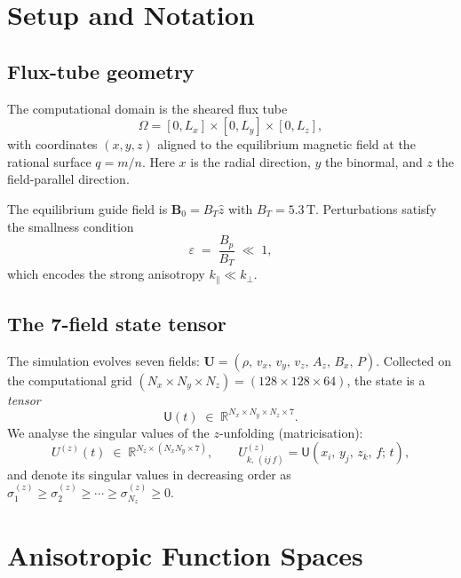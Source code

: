 \documentclass[12pt, a4paper]{article}
\newcommand{\R}{\mathbb{R}}
\newcommand{\eps}{\varepsilon}
\newcommand{\BT}{B_T}
\newcommand{\Bp}{B_p}
\newcommand{\kpar}{k_\parallel}
\newcommand{\kperp}{k_\perp}
\begin{document}
\tableofcontents

\section{Setup and Notation}
\label{sec:setup}

\subsection{Flux-tube geometry}

The computational domain is the sheared flux tube
\[
  \Omega = [0,L_x] \times [0,L_y] \times [0,L_z],
\]
with coordinates $(x, y, z)$ aligned to the equilibrium magnetic field at
the rational surface $q = m/n$.  Here $x$ is the radial direction,
$y$ the binormal, and $z$ the field-parallel direction.

The equilibrium guide field is $\mathbf{B}_0 = \BT\hat{z}$ with
$\BT = 5.3\,\text{T}$.  Perturbations satisfy the smallness condition
\begin{equation}
  \eps \;=\; \frac{\Bp}{\BT} \;\ll\; 1,
  \label{eq:epsilon}
\end{equation}
which encodes the strong anisotropy $\kpar \ll \kperp$.

\subsection{The 7-field state tensor}

The simulation evolves seven fields:
$\mathbf{U} = (\rho,\, v_x,\, v_y,\, v_z,\, A_z,\, B_x,\, P)$.
Collected on the computational grid
$(N_x \times N_y \times N_z) = (128 \times 128 \times 64)$,
the state is a \emph{tensor}
\[
  \mathsf{U}(t) \;\in\; \R^{N_x \times N_y \times N_z \times 7}.
\]
We analyse the singular values of the $z$-unfolding (matricisation):
\[
  U^{(z)}(t) \;\in\; \R^{N_z \times (N_x N_y \times 7)},
  \qquad
  U^{(z)}_{k,\,(ij\,f)} = \mathsf{U}(x_i,\, y_j,\, z_k,\, f;\, t),
\]
and denote its singular values in decreasing order as
$\sigma_1^{(z)} \geq \sigma_2^{(z)} \geq \cdots \geq \sigma_{N_z}^{(z)} \geq 0$.

\section{Anisotropic Function Spaces}
\label{sec:sobolev}
\end{document}
